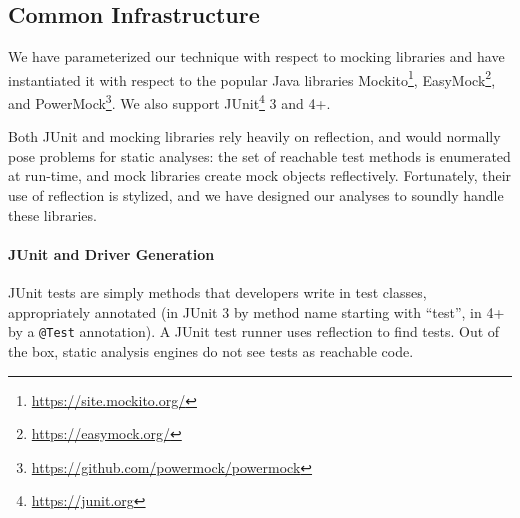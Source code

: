     

\subsection{Common Infrastructure}
\label{sec:common}
We have parameterized our technique with respect to mocking libraries and have instantiated it with respect to the popular Java libraries Mockito\footnote{\url{https://site.mockito.org/}}, EasyMock\footnote{\url{https://easymock.org/}}, and PowerMock\footnote{\url{https://github.com/powermock/powermock}}. We also support JUnit\footnote{\url{https://junit.org}} 3 and 4+. %

Both JUnit and mocking libraries rely heavily on reflection, and would normally pose problems for static analyses: the set of reachable test methods is enumerated at run-time, and mock libraries create mock objects reflectively. Fortunately, their use of reflection is stylized, and we have designed our analyses to soundly handle these libraries.

\paragraph{JUnit and Driver Generation}
JUnit tests are simply methods that developers write in test classes, appropriately annotated (in JUnit 3 by method name starting with ``test'', in 4+ by a \texttt{@Test} annotation). A JUnit test runner uses reflection to find tests. Out of the box, static analysis engines do not see tests as reachable code.


